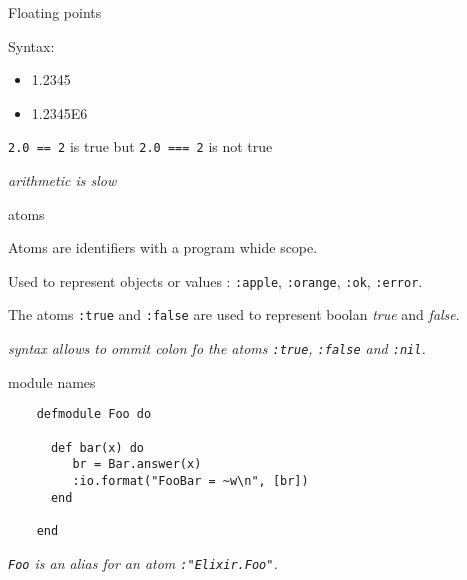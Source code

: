 \begin{frame}{Floating points}

  Syntax:
  \space{10pt}
  \begin{itemize}
  \item 1.2345 \pause
  \item 1.2345E6 \pause
  \end{itemize}

  \space{20pt}
  {\tt 2.0 == 2} is true  but {\tt 2.0 === 2} is not true

  \vspace{20pt}\pause
  {\em arithmetic is slow}  
\end{frame}

\begin{frame}{atoms}

  Atoms are identifiers with a program whide scope. \pause

  \vspace{20pt}
  Used to represent objects or values : {\tt :apple}, {\tt :orange}, {\tt :ok}, {\tt :error}. \pause

  \vspace{20pt}
  The atoms {\tt :true} and {\tt :false} are used to represent boolan {\em true} and {\em false}.\pause
  

  \vspace{20pt}
  {\em syntax allows to ommit colon fo the atoms {\tt :true}, {\tt :false} and {\tt :nil}.}
    
\end{frame}

\begin{frame}[fragile]{module names}

  \begin{lstlisting}
    defmodule Foo do

      def bar(x) do
         br = Bar.answer(x)
         :io.format("FooBar = ~w\n", [br])
      end

    end
  \end{lstlisting}

  \vspace{20pt}
  {\em {\tt Foo} is an alias for an atom {\tt :"Elixir.Foo"}.}
  
\end{frame}


